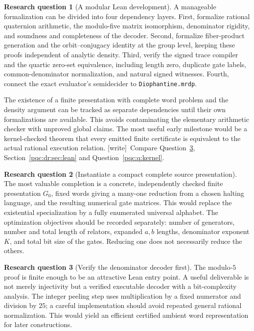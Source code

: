 \documentclass[11pt,letterpaper]{article}
\numberwithin{equation}{section}
\theoremstyle{definition}
\newtheorem{question}{Research question}
\theoremstyle{remark}
\newcommand{\code}[1]{\nolinkurl{#1}}
\newcommand{\wtag}{\textup{[write]}}
\begin{document}
\begin{question}[A modular Lean development]
\label{pqc:rr:q:lean}
A manageable formalization can be divided into four dependency layers.
First, formalize rational quaternion arithmetic, the modulo-five matrix
isomorphism, denominator rigidity, and soundness and completeness of the
decoder. Second, formalize fiber-product generation and the
orbit--conjugacy identity at the group level, keeping these proofs
independent of analytic density. Third, verify the signed trace compiler
and the quartic zero-set equivalence, including length zero, duplicate
gate labels, common-denominator normalization, and natural signed
witnesses. Fourth, connect the exact evaluator's semidecider to
\code{Diophantine.mrdp}.

The existence of a finite presentation with complete word problem and
the density argument can be tracked as separate dependencies until their
own formalizations are available. This avoids contaminating the elementary
arithmetic checker with unproved global claims. The most useful early
milestone would be a kernel-checked theorem that every emitted finite
certificate is equivalent to the actual rational execution relation.
\wtag\ Compare Question~\ref{pqc:dr:q:decoder}, Section~\ref{pqc:dr:sec:lean} and
Question~\ref{pqc:q:kernel}.
\end{question}

\begin{question}[Instantiate a compact complete source presentation]
\label{pqc:dr:q:instantiate}
The most valuable completion is a concrete, independently checked finite
presentation $G_0$, fixed words giving a many-one reduction from a chosen
halting language, and the resulting numerical gate matrices. This would
replace the existential specialization by a fully enumerated universal
alphabet. The optimization objectives should be recorded separately:
number of generators, number and total length of relators, expanded
$a,b$ lengths, denominator exponent $K$, and total bit size of the gates.
Reducing one does not necessarily reduce the others.
\end{question}

\begin{question}[Verify the denominator decoder first]
\label{pqc:dr:q:decoder}
The modulo-$5$ proof is finite enough to be an attractive Lean entry
point. A useful deliverable is not merely injectivity but a verified
executable decoder with a bit-complexity analysis. The integer peeling
step uses multiplication by a fixed numerator and division by $25$;
a careful implementation should avoid repeated general rational
normalization. This would yield an efficient certified ambient word
representation for later constructions.
\end{question}
\end{document}
